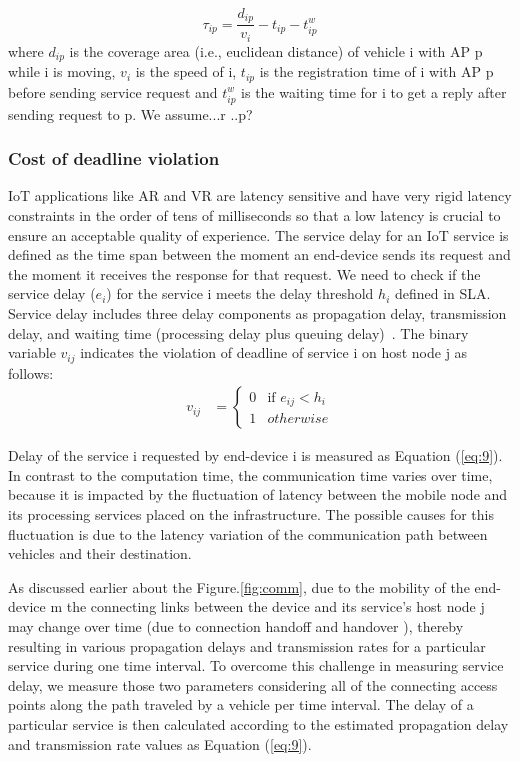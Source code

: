 \documentclass[twocolumn]{article}
\begin{document}
\begin{equation}
{\tau}_{ip} = \frac{{d}_{ip}}{v_{i}}-t_{ip}-t^{w}_{ip}
\label{eq:6.1}
\end{equation}
where $d_{ip}$ is the coverage area (i.e., euclidean distance) of vehicle i with AP p while i is moving, $v_{i}$ is the speed of i, $t_{ip}$ is the registration time of i with AP p before sending service request and $t^{w}_{ip}$ is the waiting time for i to get a reply after sending request to p.
We assume...r ..p?
\subsubsection{Cost of deadline violation}
\par IoT applications like AR and VR are latency sensitive and have very rigid latency constraints in the order of tens of milliseconds\cite{la2019enabling} so that  a low latency is crucial to ensure an acceptable quality of experience. The service delay for an IoT service is defined as the time span between the moment an end-device sends its request and the moment it receives the response for that request. We need to check if the service delay ($e_{i}$) for the service i meets the delay threshold $h_{i}$ defined in SLA. Service delay includes three delay components as propagation delay, transmission delay, and waiting time (processing delay plus queuing delay)~\cite{deng2016optimal,yousefpour2019fogplan}. The binary variable $v_{ij}$ indicates the violation of deadline of service i on host node j as follows:
\begin{align}
v_{ij} & = \left\{
\begin{array}{rl}
0 & \text{if } e_{ij}<h_{i}\\
1 & \text{} otherwise
\end{array} \right.
\label{eq:8}
\end{align}
\par Delay of the service i requested by end-device i is measured as Equation (\ref{eq:9})\cite{nezami2021decentralized}. In contrast to the computation time, the communication time varies over time, because it is impacted by the fluctuation of latency between the mobile node and its processing services placed on the infrastructure. The possible causes for this fluctuation is due to the latency variation of the communication path between vehicles and their destination.

\par As discussed earlier about the Figure.\ref{fig:comm}, due to the mobility of the end-device m the connecting links between the device and its service's host node j may change over time (due to connection handoff and handover \cite{puliafito2020mobfogsim}), thereby resulting in various propagation delays and transmission rates for a particular service during one time interval. To overcome this challenge in measuring service delay, we measure those two parameters considering all of the connecting access points along the path traveled by a vehicle per time interval. The delay of a particular service is then calculated according to the estimated propagation delay and transmission rate values as Equation (\ref{eq:9}). 
\end{document}
